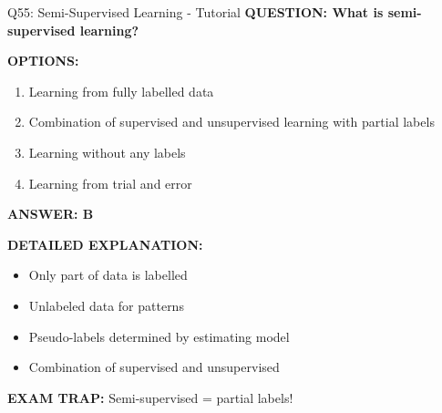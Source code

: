 \documentclass[8pt]{beamer}
\begin{document}
	\begin{frame}{Q55: Semi-Supervised Learning - Tutorial}
		\fontsize{6.5}{7.5}\selectfont
		\textbf{QUESTION: What is semi-supervised learning?}
		
		\vspace{0.1cm}
		\textbf{OPTIONS:}
		\begin{enumerate}
			\item Learning from fully labelled data
			\item Combination of supervised and unsupervised learning with partial labels
			\item Learning without any labels
			\item Learning from trial and error
		\end{enumerate}
		
		\vspace{0.1cm}
		\textcolor{myblue}{\textbf{ANSWER: B}}
		
		\vspace{0.1cm}
		\textbf{DETAILED EXPLANATION:}
		\begin{itemize}
			\item Only part of data is labelled
			\item Unlabeled data for patterns
			\item Pseudo-labels determined by estimating model
			\item Combination of supervised and unsupervised
		\end{itemize}
		
		\vspace{0.1cm}
		\textcolor{myred}{\textbf{EXAM TRAP:}} Semi-supervised = \textcolor{myblue}{partial labels}!
	\end{frame}
	
\end{document}
